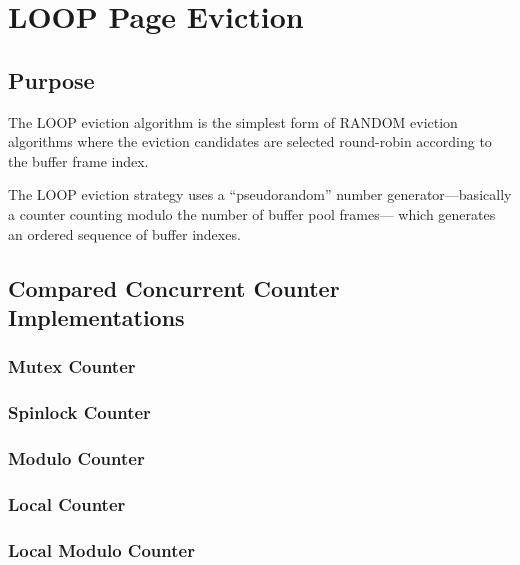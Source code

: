 \chapter[LOOP Page Eviction]{LOOP Page Eviction} \label{ch:loop}

\section[Purpose]{Purpose}

	The LOOP eviction algorithm is the simplest form of RANDOM eviction algorithms where the eviction candidates are selected round-robin according to the buffer frame index.
	
	The LOOP eviction strategy uses a ``pseudorandom'' number generator---basically a counter counting modulo the number of buffer pool frames--- which generates an ordered sequence of buffer indexes.

\section[Compared Concurrent Counter Implementations]{Compared Concurrent Counter Implementations}

	

\subsection[Mutex Counter]{Mutex Counter} \label{subsec:mutex_counter}

\subsection[Spinlock Counter]{Spinlock Counter} \label{subsec:spinlock_counter}

\subsection[Modulo Counter]{Modulo Counter} \label{subsec:modulo_counter}

\subsection[Local Counter]{Local Counter} \label{subsec:local_counter}

\subsection[Local Modulo Counter]{Local Modulo Counter} \label{subsec:local_modulo_counter}
	
